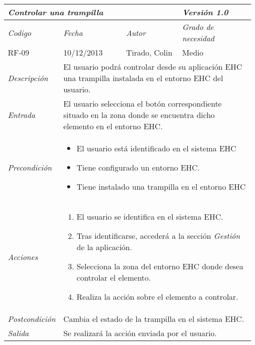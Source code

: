\begin{tabular}{|p{3cm}|p{4cm}|p{4cm}|p{4cm}|}
\hline \multicolumn{3}{|p{9cm}|}{\textit{Controlar una trampilla}} & \textit{Versi\'on 1.0} \\
\hline \textit{Codigo} & \textit{Fecha} & \textit{Autor} & \textit{Grado de necesidad} \\
RF-09 & 10/12/2013 & Tirado, Colin & Medio \\
\hline \textit{Descripci\'on} & \multicolumn{3}{|p{9cm}|}{El usuario podr\'a controlar desde su aplicaci\'on EHC una trampilla instalada en el entorno EHC del usuario.} \\
\hline \textit{Entrada} & \multicolumn{3}{|p{9cm}|}{El usuario selecciona el bot\'on correspondiente situado en la zona donde se encuentra dicho elemento en el entorno EHC.} \\
\hline \textit{Precondici\'on} & \multicolumn{3}{|p{9cm}|}{
\begin{itemize}
\item El usuario est\'a identificado en el sistema EHC
\item Tiene configurado un entorno EHC.
\item Tiene instalado una trampilla en el entorno EHC
\end{itemize}
} \\
\hline \textit{Acciones} & \multicolumn{3}{|p{9cm}|}{
\begin{enumerate}
\item El usuario se identifica en el sistema EHC.
\item Tras identificarse, acceder\'a a la secci\'on \textit{Gesti\'on} de la aplicaci\'on.
\item Selecciona la zona del entorno EHC donde desea controlar el elemento.
\item Realiza la acci\'on sobre el elemento a controlar.
\end{enumerate}
} \\
\hline \textit{Postcondici\'on} & \multicolumn{3}{|p{9cm}|}{Cambia el estado de la trampilla en el sistema EHC.} \\
\hline \textit{Salida} & \multicolumn{3}{|p{9cm}|}{Se realizar\'a la acci\'on enviada por el usuario.} \\ \hline
\end{tabular}